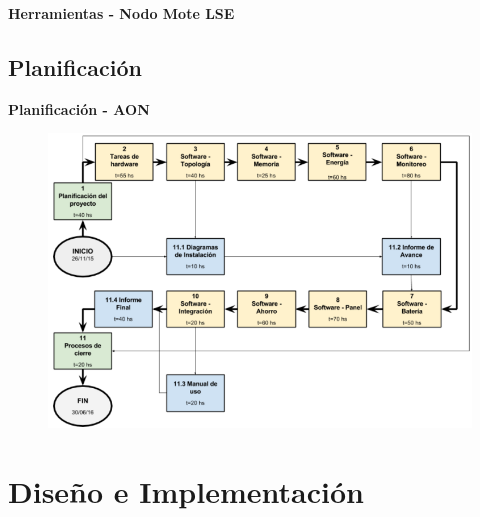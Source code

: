\documentclass[aspectratio=43, handout]{beamer}
\begin{document}
\begin{frame}{\textbf{\LARGE{Herramientas - Nodo Mote LSE}}}
\begin{minipage}[c]{1.0\linewidth}
\begin{minipage}[c]{0.35\linewidth}
\begin{figure}[H]
			\label{Mote LSE}
		\end{figure}	  	  	
	\end{minipage}
\end{minipage}
\end{frame}

\subsection[Plan]{Planificación}
\begin{frame}[t]{\textbf{\LARGE{Planificación - AON}}}
		\begin{figure}[H]
			{\includegraphics[width=1\textwidth]{./imagenes/AON.PNG}}
		\end{figure}	 
\end{frame}

\section{Diseño e Implementación}
\end{document}
